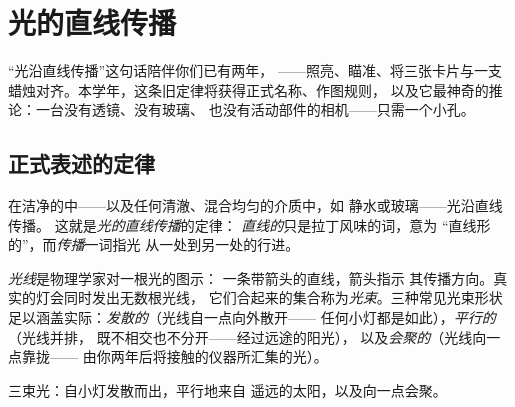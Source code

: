 \chapter{光的直线传播}\label{ch:g6:light-propagation}

“光沿直线传播”这句话陪伴你们已有两年，
——照亮、瞄准、将三张卡片与一支
蜡烛对齐。本学年，这条旧定律将获得正式名称、作图规则，
以及它最神奇的推论：一台没有透镜、没有玻璃、
也没有活动部件的相机——只需一个小孔。

\section{正式表述的定律}

\begin{proposition}[光的直线传播]\label{prop:g6:light-propagation:law}
在洁净的中——以及任何清澈、混合均匀的介质中，如
静水或玻璃——光沿直线传播。
这就是\emph{光的直线传播}的定律：
\emph{直线的}只是拉丁风味的词，意为
“直线形的”，而\emph{传播}一词指光
从一处到另一处的行进。
\end{proposition}

\begin{definition}[光线与光束]\label{def:g6:light-propagation:ray}
\emph{光线}是物理学家对一根光的图示：
一条带箭头的直线，箭头指示
其传播方向。真实的灯会同时发出无数根光线，
它们合起来的集合称为\emph{光束}。三种常见光束形状
足以涵盖实际：\emph{发散的}（光线自一点向外散开——
任何小灯都是如此），\emph{平行的}（光线并排，
既不相交也不分开——经过远途的阳光），
以及\emph{会聚的}（光线向一点靠拢——
由你两年后将接触的仪器所汇集的光）。
\end{definition}

\begin{omfigure}

{\small 三束光：自小灯发散而出，平行地来自
遥远的太阳，以及向一点会聚。}
\end{omfigure}

